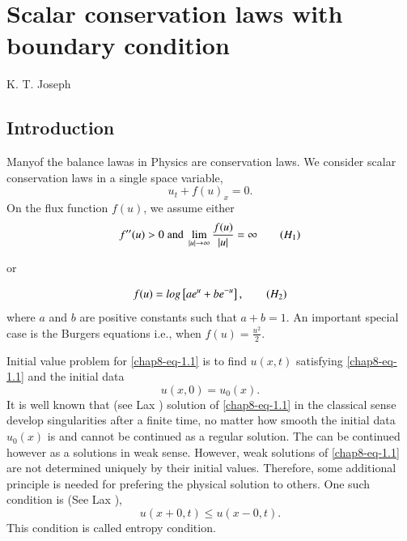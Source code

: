 \chapter{Scalar conservation laws with boundary condition}\label{chap8}


\begin{center}
K. T. Joseph
\end{center}

\section{Introduction}\label{chap8-sec-1}

\setcounter{pageoriginal}{186}
Many\pageoriginale of the balance lawas in Physics are conservation laws. We consider scalar conservation laws in a single space variable,
\begin{equation}\label{chap8-eq-1.1}
u_{t}+f(u)_{x} = 0.
\end{equation}
On the flux function $f(u)$, we assume either
\begin{equation}\label{chap8-eq-H1}
f''(u)> 0 \;\text{and}\; \lim\limits_{|u|\rightarrow \infty}\dfrac{f(u)}{|u|}= \infty\tag{$H_{1}$}
\end{equation}

\begin{center}
or
\end{center}
\begin{equation}\label{chap8-eq-H2}
f(u) = log\left[ae^{u} + be^{-u}\right],\tag{$H_{2}$}
\end{equation}
where $a$ and $b$ are positive constants such that $a+b=1$. An important special case is the Burgers equations i.e., when $f(u) = \frac{u^{2}}{2}$.

Initial value problem for \eqref{chap8-eq-1.1} is to find $u(x, t)$ satisfying  \eqref{chap8-eq-1.1} and the initial data
\begin{equation}\label{chap8-eq-1.2}
u(x, 0) = u_{0}(x).
\end{equation}
It is well known that (see Lax \cite{chap8-key8}) solution of \eqref{chap8-eq-1.1} in the classical sense develop singularities after a finite time, no matter how smooth the initial data $u_{0}(x)$ is and cannot be continued as a regular solution. The can be continued however as a solutions in weak sense. However, weak solutions of \eqref{chap8-eq-1.1} are not determined uniquely by their initial values. Therefore, some additional principle is needed for prefering the physical solution to others. One such condition is (See Lax \cite{chap8-key9}),
\begin{equation}\label{chap8-eq-1.3}
u(x+0, t)\leq u(x-0,t).
\end{equation}
This condition is called entropy condition.

